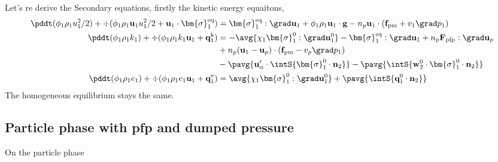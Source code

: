 Let's re derive the Secondary equations, firstly the kinetic energy equaitons, 
\begin{align*}
    \pddt (\phi_1 \rho_1u_1^2/2)  
    + \div (
        \phi_1 \rho_1\textbf{u}_1u_1^2/2
        + \textbf{u}_1 \cdot \bm{\sigma}_1^\text{eq}
    )
    &= 
     \bm{\sigma}_1^\text{eq} : \grad \textbf{u}_1
    + \phi_1 \rho_1 \textbf{u}_1\cdot \textbf{g} 
    -  n_p \textbf{u}_1\cdot 
    (\textbf{f}_\text{pm} + v_1\grad p_1)
        \\
    \pddt (\phi_1\rho_1k_1)  
    + \div (
        \phi_1\rho_1k_1\textbf{u}_1
        + \textbf{q}_1^\text{k} 
        )
    &= 
    - \avg{\chi_1\bm{\sigma}_1^0 : \grad \textbf{u}_1^0}
    - \bm{\sigma}_1^\text{eq} : \grad \textbf{u}_1
    + n_p \textbf{F}_\text{pfp} : \grad \textbf{u}_p
    \\
    &+ n_p (\textbf{u}_1 - \textbf{u}_p)
    \cdot (\textbf{f}_\text{pm} - v_p \grad p_1)\\
    &- \pavg{ \textbf{u}_\alpha' \cdot \intS{  \bm{\sigma}_1^0 \cdot \textbf{n}_2}}
    - \pavg{ \intS{\textbf{w}_2^0 \cdot \bm{\sigma}_1^0 \cdot \textbf{n}_2}} 
    \\
    \pddt (\phi_1\rho_1e_1)  
    + \div (
        \phi_1 \rho_1e_1\textbf{u}_1
        +
        \textbf{q}_1^\text{e} 
        )
    &= 
    \avg{\chi_1\bm{\sigma}_1^0 : \grad \textbf{u}_1^0}
    + \pavg{\intS{\textbf{q}_1^0 \cdot \textbf{n}_2}} 
\end{align*}
The homogeneous equilibrium stays the same. 
\subsection*{Particle phase with pfp and dumped pressure}
On the particle phase


